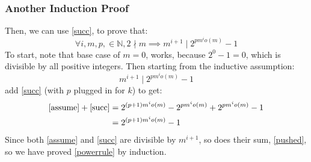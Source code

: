\documentclass{article}
\begin{document}
  \subsubsection{Another Induction Proof}
  Then, we can use \eqref{succ}, to prove that:
  \begin{equation}\label{powerrule}
    \forall i, m ,p, \in \mathbb{N}, 2 \nmid m \implies m^{i+1} \mid 2^{pm^{i}o(m)} - 1
  \end{equation}
  To start, note that base case of $m=0$, works, because $2^0 - 1 = 0$, which is divisible by all positive integers. Then starting from the inductive assumption:
  \begin{equation}\label{assume}
    m^{i+1} \mid 2^{pm^io(m)} - 1 
  \end{equation}
  add \eqref{succ} (with $p$ plugged in for $k$) to get:
  \begin{align}
    \eqref{assume} + \eqref{succ} &= 2^{(p+1)m^io(m)} - 2^{pm^io(m)} +2^{pm^io(m)} - 1\\
    &= 2^{(p+1)m^io(m)} - 1 \label{pushed}
  \end{align}
  Since both \eqref{assume} and \eqref{succ} are divisible by $m^{i+1}$, so does their sum, \eqref{pushed}, so we have proved \eqref{powerrule} by induction.
\end{document}
